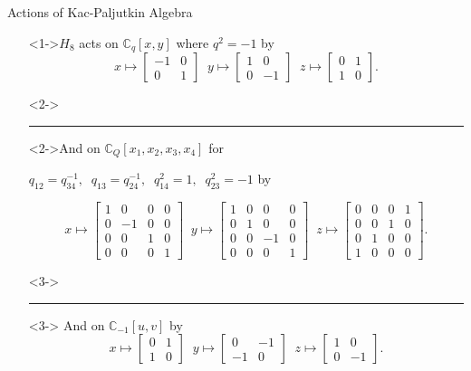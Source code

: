 \documentclass{beamer}
\begin{document}
\begin{frame}{Actions of Kac-Paljutkin Algebra}

\begin{itemize}
    \item[]<1->$H_8$ acts on $\mathbb{C}_q[x,y]$ where $q^2=-1$ by 
    \[
    x\mapsto \begin{bmatrix}-1 & 0\\0 & 1\end{bmatrix} \;\; y\mapsto \begin{bmatrix} 1 & 0\\ 0 & -1\end{bmatrix} \;\; z\mapsto\begin{bmatrix} 0 & 1\\ 1 & 0\end{bmatrix}.
    \]
    \item[]<2-> \hrule
    \item[]<2->And on $\mathbb{C}_Q[x_1,x_2,x_3,x_4]$ for 
   
    \vspace{1ex}
    $q_{12}=q_{34}^{-1},\;\;q_{13}=q_{24}^{-1},\;\;q_{14}^2=1,\;\;q_{23}^2=-1$ by


    
    \[
    x\mapsto \begin{bmatrix} 1&0&0&0\\0&-1&0&0\\0&0&1&0\\0&0&0&1\end{bmatrix} \;\; y\mapsto \begin{bmatrix} 1&0&0&0\\0&1&0&0\\0&0&-1&0\\0&0&0&1\end{bmatrix}\;\; z\mapsto\begin{bmatrix}0&0&0&1\\0&0&1&0\\0&1&0&0\\1&0&0&0\end{bmatrix}.
    \]
    
    \item[]<3->\hrule
    \item[]<3-> And on $\mathbb{C}_{-1}[u,v]$ by 
    \[
    x\mapsto \begin{bmatrix}0&1\\1&0\end{bmatrix}\;\; y\mapsto\begin{bmatrix}0&-1\\-1&0\end{bmatrix}\;\; z\mapsto\begin{bmatrix}1&0\\0&-1\end{bmatrix}.
    \]
\end{itemize}
\end{frame}
\end{document}
